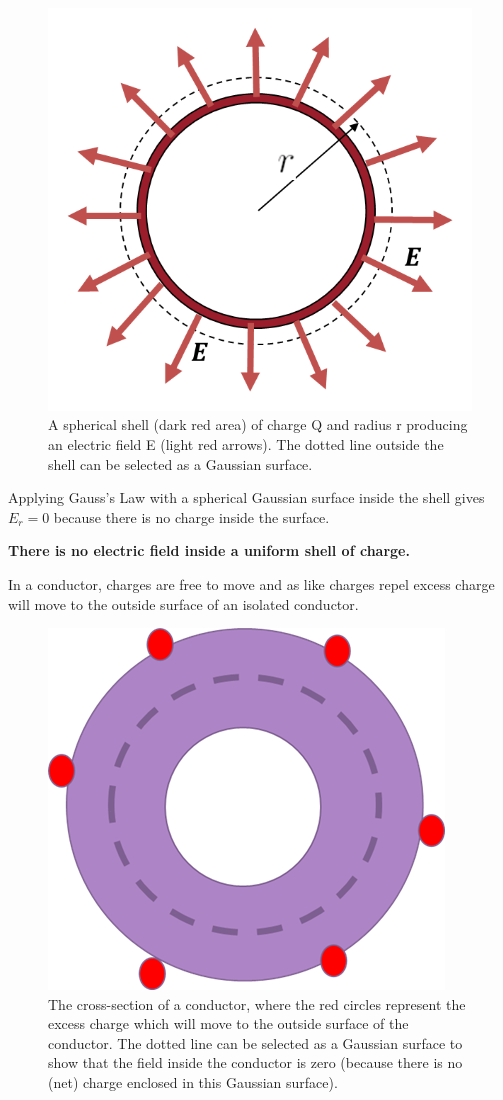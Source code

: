 \documentclass[
]{book}
\begin{document}
\begin{figure}

{\centering \includegraphics[width=0.7\linewidth]{Figures/GaussOutsideShell} 

}

\caption{A spherical shell (dark red area) of charge Q and radius r producing an electric field E (light red arrows). The dotted line outside the shell can be selected as a Gaussian surface. }\label{fig:GaussOutsideShell}
\end{figure}

Applying Gauss's Law with a spherical Gaussian surface inside the shell
gives \(E_r = 0\) because there is no charge inside the surface.

\textbf{There is no electric field inside a uniform shell of charge.}

In a conductor, charges are free to move and as like charges repel
excess charge will move to the outside surface of an isolated conductor.

\begin{figure}

{\centering \includegraphics[width=0.7\linewidth]{Figures/GaussInsideShell} 

}

\caption{The cross-section of a conductor, where the red circles represent the excess charge which will move to the outside surface of the conductor. The dotted line can be selected as a Gaussian surface to show that the field inside the conductor is zero (because there is no (net) charge enclosed in this Gaussian surface).}\label{fig:GaussInsideShell}
\end{figure}
\end{document}
